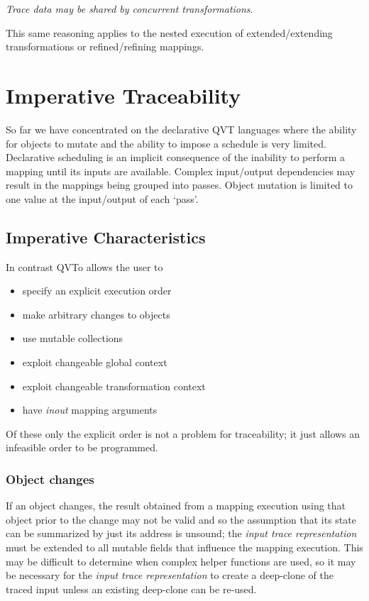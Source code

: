 \documentclass[runningheads,a4paper]{llncs}
\begin{document}
 \emph{Trace data may be shared by concurrent transformations}.
 
This same reasoning applies to the nested execution of extended/extending transformations or refined/refining mappings.

\section{Imperative Traceability}\label{imperative}

So far we have concentrated on the declarative QVT languages where the ability for objects to mutate and the ability to impose a schedule is very limited. Declarative scheduling is an implicit consequence of the inability to perform a mapping until its inputs are available. Complex input/output dependencies may result in the mappings being grouped into passes. Object mutation is limited to one value at the input/output of each `pass'.

\subsection{Imperative Characteristics}

In contrast QVTo allows the user to
\begin{itemize}
\item specify an explicit execution order
\item make arbitrary changes to objects
\item use mutable collections
\item exploit changeable global context
\item exploit changeable transformation context
\item have \emph{inout} mapping arguments
\end{itemize}

Of these only the explicit order is not a problem for traceability; it just allows an infeasible order to be programmed.

\subsubsection{Object changes}

If an object changes, the result obtained from a mapping execution using that object prior to the change may not be valid and so the assumption that its state can be summarized by just its address is unsound; the \emph{input trace representation} must be extended to all mutable fields that influence the mapping execution. This may be difficult to determine when complex helper functions are used, so it may be necessary for the \emph{input trace representation} to create a deep-clone of the traced input unless an existing deep-clone can be re-used.
\end{document}
